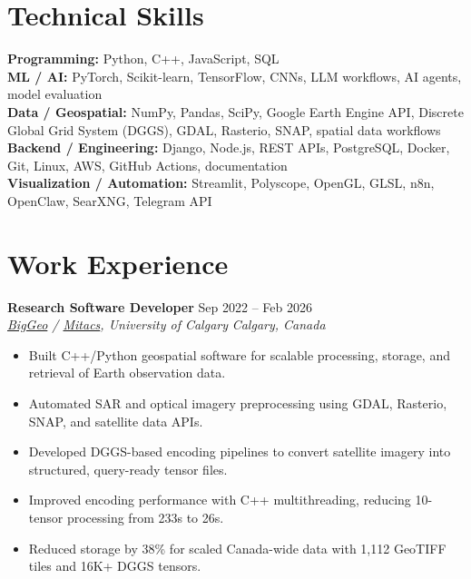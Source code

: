 \documentclass[a4paper,10pt]{article}
\newcommand{\resumeSubheading}[4]{
    \textbf{#1} \hfill #2 \\
    \textit{#3} \hfill \textit{#4}
}
\begin{document}
\section*{Technical Skills}

\textbf{Programming:} Python, C++, JavaScript, SQL \\
\textbf{ML / AI:} PyTorch, Scikit-learn, TensorFlow, CNNs, LLM workflows, AI agents, model evaluation \\
\textbf{Data / Geospatial:} NumPy, Pandas, SciPy, Google Earth Engine API, Discrete Global Grid System (DGGS), GDAL, Rasterio, SNAP, spatial data workflows \\
\textbf{Backend / Engineering:} Django, Node.js, REST APIs, PostgreSQL, Docker, Git, Linux, AWS, GitHub Actions, documentation \\
\textbf{Visualization / Automation:} Streamlit, Polyscope, OpenGL, GLSL, n8n, OpenClaw, SearXNG, Telegram API


\section*{Work Experience}

\resumeSubheading
{Research Software Developer}
{Sep 2022 -- Feb 2026}
{\href{https://biggeo.com}{BigGeo} / \href{https://www.mitacs.ca/}{Mitacs}, University of Calgary}
{Calgary, Canada}
\begin{itemize}[leftmargin=0.25in]
    \item Built C++/Python geospatial software for scalable processing, storage, and retrieval of Earth observation data.
    \item Automated SAR and optical imagery preprocessing using GDAL, Rasterio, SNAP, and satellite data APIs.
    \item Developed DGGS-based encoding pipelines to convert satellite imagery into structured, query-ready tensor files.
    \item Improved encoding performance with C++ multithreading, reducing 10-tensor processing from 233s to 26s.
    \item Reduced storage by 38\% for scaled Canada-wide data with 1,112 GeoTIFF tiles and 16K+ DGGS tensors.
\end{itemize}
\end{document}
